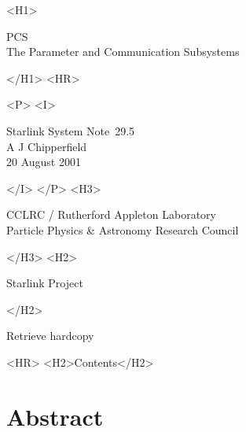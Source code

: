 \documentclass[twoside,11pt]{article}
\newcommand{\stardoccategory}  {Starlink System Note}
\newcommand{\stardocsource}    {ssn\stardocnumber}
\newcommand{\stardocnumber}    {29.5}
\newcommand{\stardocauthors}   {A J Chipperfield}
\newcommand{\stardocdate}      {20 August 2001}
\newcommand{\stardoctitle}     {PCS\\[1ex]
                                The Parameter and Communication Subsystems}
\newcommand{\htmladdnormallink}[2]{#1}
\newcommand{\htmladdimg}[1]{}
\newcommand{\htmlref}[2]{#1}
\newcommand{\htmladdtonavigation}[1]{}
\newcommand{\xlabel}[1]{}
\renewcommand{\_}{\texttt{\symbol{95}}}
\begin{document}
\begin{htmlonly}
   \xlabel{}
   \begin{rawhtml} <H1> \end{rawhtml}
      \stardoctitle
   \begin{rawhtml} </H1> <HR> \end{rawhtml}

   \begin{rawhtml} <P> <I> \end{rawhtml}
   \stardoccategory\ \stardocnumber \\
   \stardocauthors \\
   \stardocdate
   \begin{rawhtml} </I> </P> <H3> \end{rawhtml}
      \htmladdnormallink{CCLRC / Rutherford Appleton Laboratory}
                        {http://www.cclrc.ac.uk} \\
      \htmladdnormallink{Particle Physics \& Astronomy Research Council}
                        {http://www.pparc.ac.uk} \\
   \begin{rawhtml} </H3> <H2> \end{rawhtml}
      \htmladdnormallink{Starlink Project}{http://www.starlink.rl.ac.uk/}
   \begin{rawhtml} </H2> \end{rawhtml}
   \htmladdnormallink{\htmladdimg{source.gif} Retrieve hardcopy}
      {http://www.starlink.rl.ac.uk/cgi-bin/hcserver?\stardocsource}\\

  \label{stardoccontents}
  \begin{rawhtml} 
    <HR>
    <H2>Contents</H2>
  \end{rawhtml}
  \htmladdtonavigation{\htmlref{\htmladdimg{contents_motif.gif}}
        {stardoccontents}}

  \section{\xlabel{abstract}Abstract}

\end{htmlonly}
\end{document}
